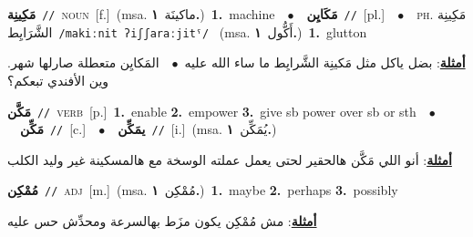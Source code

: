 \documentclass[10pt,a4paper,twoside]{article} %
\begin{document}
\begin{multicols}{2}
{\setlength\topsep{0pt}\textbf{\foreignlanguage{arabic}{مَكِينِة}}\ {\color{gray}\texttt{//}\color{black}}\ \textsc{noun}\ [f.]\ \color{gray}(msa. \foreignlanguage{arabic}{ماكينَة}~\foreignlanguage{arabic}{\textbf{١.}})\color{black}\ \textbf{1.}~machine\ \ $\bullet$\ \ \setlength\topsep{0pt}\textbf{\foreignlanguage{arabic}{مَكَايِن}}\ {\color{gray}\texttt{//}\color{black}}\ [pl.]\ \ $\bullet$\ \ \textsc{ph.} \color{gray} \foreignlanguage{arabic}{مَكِينِة الشَّرَايِط}\color{black}\ {\color{gray}\texttt{/{\sffamily makiːnit ʔiʃʃaraːjitˤ}/}\color{black}}\ \color{gray} (msa. \foreignlanguage{arabic}{أَكُّول}~\foreignlanguage{arabic}{\textbf{١.}})\color{black}\ \textbf{1.}~glutton\  \begin{flushright}\color{gray}\foreignlanguage{arabic}{\textbf{\underline{\foreignlanguage{arabic}{أمثلة}}}: بضل ياكل مثل مَكينِة الشَّرايِط ما ساء الله عليه\ $\bullet$\ \  المَكايِن متعطلة صارلها شهر. وين الأفندي تبعكم؟}\end{flushright}\color{black}} \vspace{2mm}

{\setlength\topsep{0pt}\textbf{\foreignlanguage{arabic}{مَكَّن}}\ {\color{gray}\texttt{//}\color{black}}\ \textsc{verb}\ [p.]\ \textbf{1.}~enable  \textbf{2.}~empower  \textbf{3.}~give sb power over sb or sth\ \ $\bullet$\ \ \setlength\topsep{0pt}\textbf{\foreignlanguage{arabic}{مَكِّن}}\ {\color{gray}\texttt{//}\color{black}}\ [c.]\ \ $\bullet$\ \ \setlength\topsep{0pt}\textbf{\foreignlanguage{arabic}{يمَكِّن}}\ {\color{gray}\texttt{//}\color{black}}\ [i.]\ \color{gray}(msa. \foreignlanguage{arabic}{يُمَكِّن}~\foreignlanguage{arabic}{\textbf{١.}})\color{black}\  \begin{flushright}\color{gray}\foreignlanguage{arabic}{\textbf{\underline{\foreignlanguage{arabic}{أمثلة}}}: أنو اللي مَكَّن هالحقير لحتى يعمل عملته الوسخة مع هالمسكينة غير وليد الكلب}\end{flushright}\color{black}} \vspace{2mm}

{\setlength\topsep{0pt}\textbf{\foreignlanguage{arabic}{مُمْكِن}}\ {\color{gray}\texttt{//}\color{black}}\ \textsc{adj}\ [m.]\ \color{gray}(msa. \foreignlanguage{arabic}{مُمْكِن}~\foreignlanguage{arabic}{\textbf{١.}})\color{black}\ \textbf{1.}~maybe  \textbf{2.}~perhaps  \textbf{3.}~possibly\  \begin{flushright}\color{gray}\foreignlanguage{arabic}{\textbf{\underline{\foreignlanguage{arabic}{أمثلة}}}: مش مُمْكِن يكون مزَط بهالسرعة ومحدِّش حس عليه}\end{flushright}\color{black}} \vspace{2mm}


\end{multicols}
\end{document}

